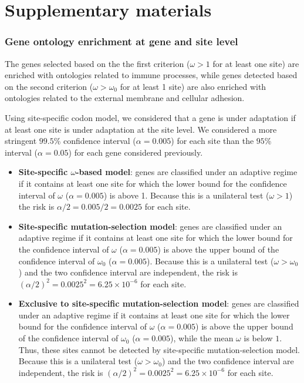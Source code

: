 \documentclass{article}
\renewcommand*{\bm}[1]{#1}%
\begin{document}
    \part*{Supplementary materials}
    \tableofcontents

    \pagebreak


    \section{Gene ontology enrichment at gene and site level}
    \label{sec:gene-ontology-enrichment}

    The genes selected based on the the first criterion ($\omega>1$ for at least one site) are enriched with ontologies related to immune processes, while genes detected based on the second criterion ($\omega > \omega_{0}$ for at least 1 site) are also enriched with ontologies related to the external membrane and cellular adhesion.

    Using site-specific codon model, we considered that a gene is under adaptation if at least one site is under adaptation at the site level.
    We considered a more stringent $99.5$\% confidence interval ($\alpha=0.005$) for each site than the $95$\% interval ($\alpha=0.05$) for each gene considered previously.

    \begin{itemize}
        \item \textbf{Site-specific $\bm{\omega}$-based model}: genes are classified under an adaptive regime if it contains at least one site for which the lower bound for the confidence interval of $\omega$ ($\alpha=0.005$) is above 1. Because this is a unilateral test ($\omega > 1$) the risk is $\alpha/2=0.005/2=0.0025$ for each site.
        \item \textbf{Site-specific mutation-selection model}: genes are classified under an adaptive regime if it contains at least one site for which the lower bound for the confidence interval of $\omega$ ($\alpha=0.005$) is above the upper bound of the confidence interval of $\omega_{0}$ ($\alpha=0.005$). Because this is a unilateral test ($\omega > \omega_{0}$) and the two confidence interval are independent, the risk is $(\alpha/2)^2=0.0025^2=6.25 \times 10^{-6}$ for each site.
        \item \textbf{Exclusive to site-specific mutation-selection model}: genes are classified under an adaptive regime if it contains at least one site for which the lower bound for the confidence interval of $\omega$ ($\alpha=0.005$) is above the upper bound of the confidence interval of $\omega_{0}$ ($\alpha=0.005$), while the mean $\omega$ is below $1$. Thus, these sites cannot be detected by site-specific mutation-selection model. Because this is a unilateral test ($\omega > \omega_{0}$) and the two confidence interval are independent, the risk is $(\alpha/2)^2=0.0025^2=6.25 \times 10^{-6}$ for each site.
    \end{itemize}
\end{document}
